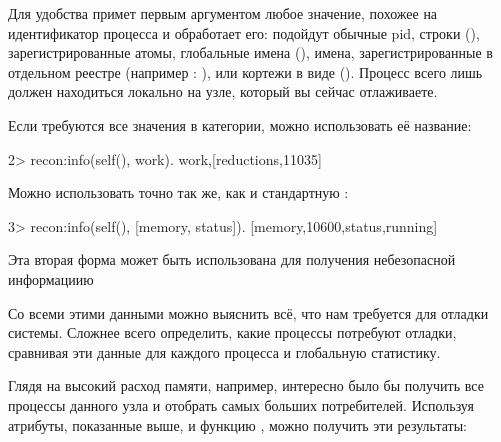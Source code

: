 Для удобства  примет первым аргументом любое значение, похожее на идентификатор процесса и обработает его: подойдут обычные pid, строки (), зарегистрированные атомы, глобальные имена (), имена, зарегистрированные в отдельном реестре (например : ), или кортежи в виде (). Процесс всего лишь должен находиться локально на узле, который вы сейчас отлаживаете.

Если требуются все значения в категории, можно использовать её название:

\begin{VerbatimEshell}
2> recon:info(self(), work).
{work,[{reductions,11035}]}
\end{VerbatimEshell}

Можно использовать точно так же, как и стандартную :

\begin{VerbatimEshell}
3> recon:info(self(), [memory, status]).
[{memory,10600},{status,running}]
\end{VerbatimEshell}

Эта вторая форма может быть использована для получения небезопасной информациию

Со всеми этими данными можно выяснить всё, что нам требуется для отладки системы. Сложнее всего определить, какие процессы потребуют отладки, сравнивая эти данные для каждого процесса и глобальную статистику.

Глядя на высокий расход памяти, например, интересно было бы получить все процессы данного узла и отобрать  самых больших потребителей. Используя атрибуты, показанные выше, и функцию , можно получить эти результаты:

